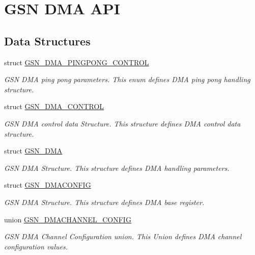 \hypertarget{a00645}{
\section{GSN DMA API}
\label{a00645}
}
\subsection*{Data Structures}
\begin{DoxyCompactItemize}
\item 
struct \hyperlink{a00051}{GSN\_\-DMA\_\-PINGPONG\_\-CONTROL}
\begin{DoxyCompactList}\small\item\em GSN DMA ping pong parameters. This enum defines DMA ping pong handling structure. \end{DoxyCompactList}\item 
struct \hyperlink{a00050}{GSN\_\-DMA\_\-CONTROL}
\begin{DoxyCompactList}\small\item\em GSN DMA control data Structure. This structure defines DMA control data structure. \end{DoxyCompactList}\item 
struct \hyperlink{a00049}{GSN\_\-DMA}
\begin{DoxyCompactList}\small\item\em GSN DMA Structure. This structure defines DMA handling parameters. \end{DoxyCompactList}\item 
struct \hyperlink{a00053}{GSN\_\-DMACONFIG}
\begin{DoxyCompactList}\small\item\em GSN DMA Structure. This structure defines DMA base register. \end{DoxyCompactList}\item 
union \hyperlink{a00052}{GSN\_\-DMACHANNEL\_\-CONFIG}
\begin{DoxyCompactList}\small\item\em GSN DMA Channel Configuration union. This Union defines DMA channel configuration values. \end{DoxyCompactList}\end{DoxyCompactItemize}
